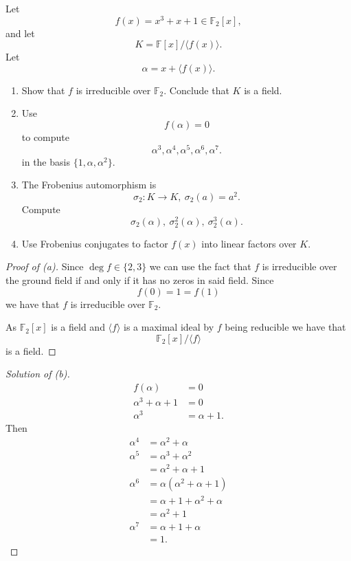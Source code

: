 \begin{prob}
    Let 
    \[
        f(x) = x^3 + x + 1 \in \mathbb F_2[x],
    \]
    and let 
    \[
        K = \mathbb F[x]/\langle f(x) \rangle.
    \]
    Let 
    \[
        \alpha = x + \langle f(x) \rangle.
    \]

    \begin{enumerate}[label=\alph*)]
        \item Show that $f$ is irreducible over 
            $\mathbb F_2$. Conclude that $K$ is a field.
        \item Use 
            \[
                f(\alpha) = 0
            \]
            to compute 
            \[
                \alpha^3, \alpha^4, 
                \alpha^5, \alpha^6, \alpha^7.
            \]
            in the basis $\{1,\alpha,\alpha^2\}$.
        \item The Frobenius automorphism is
            \[
                \sigma_2 : K \to K, \ \sigma_2(a) = a^2.
            \]
            Compute 
            \[
                \sigma_2(\alpha), \ \sigma_2^2(\alpha), \ 
                \sigma_2^3(\alpha).
            \]
        \item Use Frobenius conjugates to factor 
            $f(x)$ into linear factors over $K$.
    \end{enumerate}
\end{prob}
\begin{proof}[Proof of (a)]
    Since $\deg f \in \{2,3\}$ we can use the fact that $f$ is 
    irreducible over the ground field if and only if 
    it has no zeros in said field. 
    Since 
    \[
        f(0) = 1 = f(1)
    \]
    we have that $f$ is irreducible over $\mathbb F_2$.

    As $\mathbb F_2[x]$ is a field and $\langle f \rangle$ is 
    a maximal ideal by $f$ being reducible we have that 
    \[
        \mathbb F_2[x]/\langle f \rangle
    \]
    is a field. 
\end{proof}
\begin{proof}[Solution of (b)]
    \begin{align*}
        f(\alpha) 
        &= 0 \\ 
        \alpha^3 + \alpha + 1 
        &= 0 \\ 
        \alpha^3 
        &= \alpha + 1. 
    \end{align*}
    Then 
    \begin{align*}
        \alpha^4 &= \alpha^2 + \alpha \\ 
        \alpha^5 &= \alpha^3 + \alpha^2 \\ 
                 &= \alpha^2 + \alpha + 1 \\ 
        \alpha^6 &= \alpha(\alpha^2 + \alpha + 1) \\ 
                 &= \alpha + 1 + \alpha^2 + \alpha \\ 
                 &= \alpha^2 + 1  \\ 
        \alpha^7 &= \alpha + 1 + \alpha \\ 
                 &= 1.
    \end{align*}
\end{proof}
